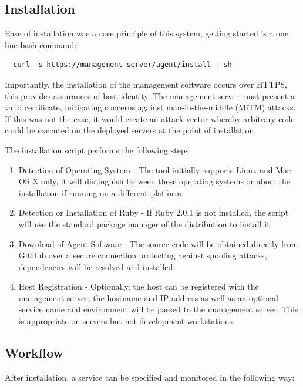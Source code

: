 \documentclass{cshonours}
\begin{document}
\subsection{Installation}

Ease of installation was a core principle of this system, getting started is a one line bash command:

\label{bashinstall}
\begin{verbatim}
  curl -s https://management-server/agent/install | sh
\end{verbatim}

Importantly, the installation of the management software occurs over HTTPS, this provides assurances of host identity. The management server must present a valid certificate, mitigating concerns against man-in-the-middle (MiTM) attacks. If this was not the case, it would create an attack vector whereby arbitrary code could be executed on the deployed servers at the point of installation.

The installation script performs the following steps:

\begin{enumerate}
  \item{Detection of Operating System} - The tool initially supports Linux and Mac OS X only, it will distinguish between these operating systems or abort the installation if running on a different platform.
  \item{Detection or Installation of Ruby} - If Ruby 2.0.1 is not installed, the script will use the standard package manager of the distribution to install it.
  \item{Download of Agent Software} - The source code will be obtained directly from GitHub over a secure connection protecting against spoofing attacks, dependencies will be resolved and installed.
  \item{Host Registration} - Optionally, the host can be registered with the management server, the hostname and IP address as well as an optional service name and environment will be passed to the management server. This is appropriate on servers but not development workstations.
\end{enumerate}

\subsection{Workflow}

After installation, a service can be specified and monitored in the following way:
\end{document}
